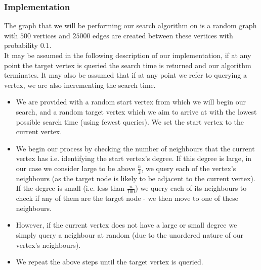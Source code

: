 \documentclass[12pt, a4paper]{article}
\begin{document}
\subsubsection*{Implementation}
The graph that we will be performing our search algorithm on is a random graph with $500$ vertices and $25000$ edges are created between these vertices with probability $0.1$.\\
It may be assumed in the following description of our implementation, if at any point the target vertex is queried the search time is returned and our algorithm terminates. It may also be assumed that if at any point we refer to querying a vertex, we are also incrementing the search time.
\begin{itemize}
\renewcommand\labelitemi{\tiny$\bullet$}
\item We are provided with a random start vertex from which we will begin our search, and a random target vertex which we aim to arrive at with the lowest possible search time (using fewest queries). We set the start vertex to the current vertex.
\item We begin our process by checking the number of neighbours that the current vertex has i.e. identifying the start vertex's degree. If this degree is large, in our case we consider large to be above $\frac{n}{2}$, we query each of the vertex's neighbours (as the target node is likely to be adjacent to the current vertex). If the degree is small (i.e. less than $\frac{n}{100}$) we query each of its neighbours to check if any of them are the target node - we then move to one of these neighbours.
\item However, if the current vertex does not have a large or small degree we simply query a neighbour at random (due to the unordered nature of our vertex's neighbours).
\item We repeat the above steps until the target vertex is queried.
\end{itemize}
\end{document}
